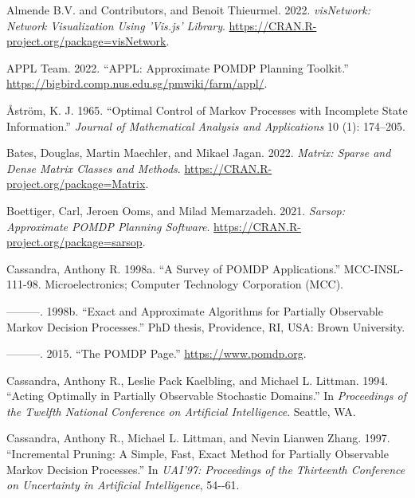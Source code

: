 \hypertarget{refs}{}
\begin{CSLReferences}{1}{0}
\leavevmode{}%
Almende B.V. and Contributors, and Benoit Thieurmel. 2022. \emph{visNetwork: Network Visualization Using 'Vis.js' Library}. \url{https://CRAN.R-project.org/package=visNetwork}.

\leavevmode{}%
APPL Team. 2022. {``{APPL}: {A}pproximate {POMDP} Planning Toolkit.''} \url{https://bigbird.comp.nus.edu.sg/pmwiki/farm/appl/}.

\leavevmode{}%
Åström, K. J. 1965. {``Optimal Control of {M}arkov Processes with Incomplete State Information.''} \emph{Journal of Mathematical Analysis and Applications} 10 (1): 174--205.

\leavevmode{}%
Bates, Douglas, Martin Maechler, and Mikael Jagan. 2022. \emph{Matrix: Sparse and Dense Matrix Classes and Methods}. \url{https://CRAN.R-project.org/package=Matrix}.

\leavevmode{}%
Boettiger, Carl, Jeroen Ooms, and Milad Memarzadeh. 2021. \emph{Sarsop: {A}pproximate {POMDP} Planning Software}. \url{https://CRAN.R-project.org/package=sarsop}.

\leavevmode{}%
Cassandra, Anthony R. 1998a. {``A Survey of {POMDP} Applications.''} MCC-INSL-111-98. Microelectronics; Computer Technology Corporation (MCC).

\leavevmode{}%
---------. 1998b. {``Exact and Approximate Algorithms for Partially Observable Markov Decision Processes.''} PhD thesis, Providence, RI, USA: Brown University.

\leavevmode{}%
---------. 2015. {``The {POMDP} Page.''} \url{https://www.pomdp.org}.

\leavevmode{}%
Cassandra, Anthony R., Leslie Pack Kaelbling, and Michael L. Littman. 1994. {``Acting Optimally in Partially Observable Stochastic Domains.''} In \emph{Proceedings of the Twelfth National Conference on Artificial Intelligence}. Seattle, WA.

\leavevmode{}%
Cassandra, Anthony R., Michael L. Littman, and Nevin Lianwen Zhang. 1997. {``Incremental Pruning: {A} Simple, Fast, Exact Method for Partially Observable {M}arkov Decision Processes.''} In \emph{UAI'97: Proceedings of the Thirteenth Conference on Uncertainty in Artificial Intelligence}, 54-\/-61.


\end{CSLReferences}
